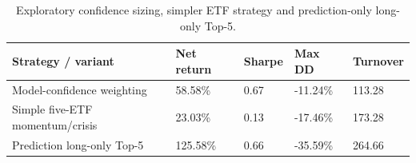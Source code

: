\begin{table}[htbp]
\caption{Exploratory confidence sizing, simpler ETF strategy and prediction-only long-only Top-5.}
\label{tab:advanced}
\begin{tabular}{lllll}
\toprule
Strategy / variant & Net return & Sharpe & Max DD & Turnover \\
\midrule
Model-confidence weighting & 58.58\% & 0.67 & -11.24\% & 113.28 \\
Simple five-ETF momentum/crisis & 23.03\% & 0.13 & -17.46\% & 173.28 \\
Prediction long-only Top-5 & 125.58\% & 0.66 & -35.59\% & 264.66 \\
\bottomrule
\end{tabular}
\end{table}

